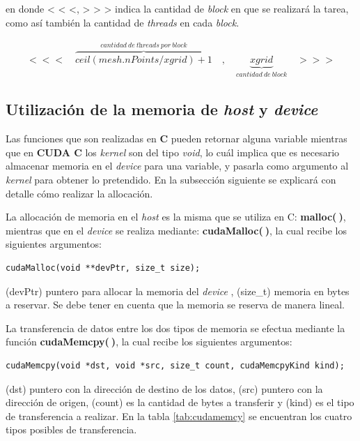 en donde < < <, > > > indica la cantidad de \textit{block} en que se realizará la tarea, como así también la cantidad de \textit{threads} en cada \textit{block}.

\begin{align*}
		<<<\quad \overbrace{ceil(mesh.nPoints/xgrid)+1}^{cantidad \>de\> \textit{threads}\> por\> \textit{block}}\quad,\quad \underbrace{xgrid}_{cantidad\>de\>block} \quad>>>
\end{align*}



\subsection{Utilización de la memoria de \textit{host} y \textit{device}}


Las funciones que son realizadas en \textbf{C} pueden retornar alguna variable mientras que en \textbf{CUDA C} los \textit{kernel} son del tipo \textit{void}, lo cuál implica que es necesario almacenar memoria en el \textit{device} para una variable, y pasarla como argumento al \textit{kernel} para obtener lo pretendido. En la subsección siguiente se explicará con detalle cómo realizar la allocación.


La allocación de memoria en el \textit{host} es la misma que se utiliza en C: \textbf{malloc($\>$)}, mientras que en el \textit{device} se realiza mediante: \textbf{cudaMalloc($\>$)}, la cual recibe los siguientes argumentos:
{\footnotesize
\begin{frame}{}
	\begin{lstlisting}
cudaMalloc(void **devPtr, size_t size);
	\end{lstlisting}

\end{frame}
}
(devPtr) puntero para allocar la memoria del \textit{device} , (size\_t) memoria en bytes a reservar. Se debe tener en cuenta que la memoria se reserva de manera lineal.

La transferencia de datos entre los dos tipos de memoria se efectua mediante la función \textbf{cudaMemcpy($\>$)}, la cual recibe los siguientes argumentos:
{\footnotesize
\begin{frame}{}
	\begin{lstlisting}
cudaMemcpy(void *dst, void *src, size_t count, cudaMemcpyKind kind);
	\end{lstlisting}
	
\end{frame}
}
(dst) puntero con la dirección de destino de los datos, (src) puntero con la dirección de origen, (count) es la cantidad de bytes a transferir y (kind) es el tipo de transferencia a realizar\cite{zone2020cuda}. En la tabla \ref{tab:cudamemcy} se encuentran los cuatro tipos posibles de transferencia.

